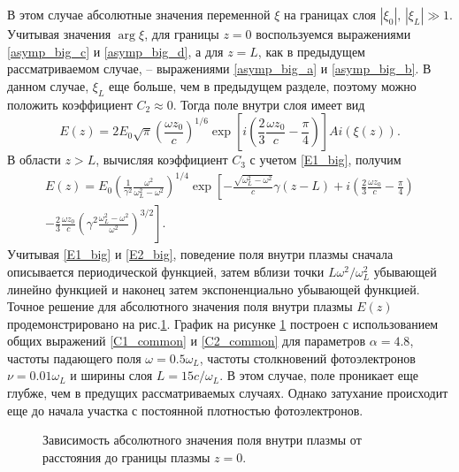 \documentclass[12pt,a4paper]{article}
\numberwithin{equation}{section}
\begin{document}
{В этом случае абсолютные значения переменной $\xi$ на границах слоя $|\xi_0|, \, |\xi_L| \gg 1$. Учитывая значения $\arg \xi$, для границы $z=0$ воспользуемся выражениями \eqref{asymp_big_c} и \eqref{asymp_big_d}, а для $z=L$, как в предыдущем рассматриваемом случае, -- выражениями \eqref{asymp_big_a} и \eqref{asymp_big_b}. В данном случае, $\xi_L$ еще больше, чем в предыдущем разделе, поэтому можно положить коэффициент $C_2\approx 0$. Тогда поле внутри слоя имеет вид
\begin{equation}
  \label{E1_big}
  E\left(z\right) = 2E_0\sqrt{\pi}\left(\frac{\omega z_0}{c}\right)^{1/6}\exp\left[i\left(\frac{2}{3} \frac{\omega z_0}{c}-\frac{\pi}{4}\right)\right]Ai\left(\xi\left(z\right)\right).
\end{equation}
В области $z>L$, вычисляя коэффициент $C_3$ с учетом \eqref{E1_big}, получим
\begin{eqnarray}
    E\left(z\right) = E_0\left(\frac{1}{\gamma^2}\frac{\omega^2}{\omega_L^2-\omega^2}\right)^{1/4}\exp\left[-\frac{\sqrt{\omega_L^2-\omega^2}}{c}\gamma\left(z-L\right)+i\left(\frac{2}{3} \frac{\omega z_0}{c}-\frac{\pi}{4}\right)\right. \nonumber \\
    -\left.\frac{2}{3} \frac{\omega z_0}{c}\left(\gamma^2\frac{\omega_L^2-\omega^2}{\omega^2}\right)^{3/2}\right].
    \label{E2_big}
\end{eqnarray}
Учитывая \eqref{E1_big} и \eqref{E2_big}, поведение поля внутри плазмы сначала описывается периодической функцией, затем вблизи точки $L\omega^2/\omega_L^2$ убывающей линейно функцией и наконец затем экспоненциально убывающей функцией. Точное решение для абсолютного значения поля внутри плазмы $E\left(z\right)$ продемонстрировано на рис.\ref{E_big}. График на рисунке \ref{E_big} построен с использованием общих выражений \eqref{C1_common} и \eqref{C2_common} для параметров $\alpha = 4.8$, частоты падающего поля $\omega = 0.5\omega_L$, частоты столкновений фотоэлектронов $\nu = 0.01 \omega_L$ и ширины слоя $L = 15 c/\omega_L$. В этом случае, поле проникает еще глубже, чем в предущих рассматриваемых случаях. Однако затухание происходит еще до начала участка с постоянной плотностью фотоэлектронов.  
\begin{figure}[!ht]	
	\caption{Зависимость абсолютного значения  поля внутри плазмы от расстояния до границы плазмы $z=0$.}
    \label{E_big}
\end{figure}

}
\end{document}
